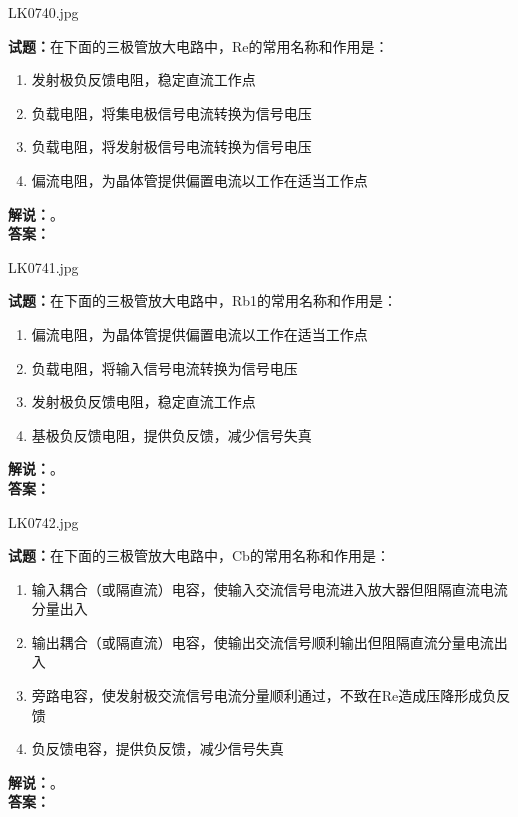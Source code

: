 \documentclass{ctexbook}
\begin{document}
LK0740.jpg

\noindent\textbf{试题：}在下面的三极管放大电路中，Re的常用名称和作用是：
\begin{enumerate}[leftmargin=3em]
  \item 发射极负反馈电阻，稳定直流工作点
  \item 负载电阻，将集电极信号电流转换为信号电压
  \item 负载电阻，将发射极信号电流转换为信号电压
  \item 偏流电阻，为晶体管提供偏置电流以工作在适当工作点
\end{enumerate}
\noindent\textbf{解说：}\textbf{}。\\\noindent\textbf{答案：}

\vspace{\baselineskip}

LK0741.jpg

\noindent\textbf{试题：}在下面的三极管放大电路中，Rb1的常用名称和作用是：
\begin{enumerate}[leftmargin=3em]
  \item 偏流电阻，为晶体管提供偏置电流以工作在适当工作点
  \item 负载电阻，将输入信号电流转换为信号电压
  \item 发射极负反馈电阻，稳定直流工作点
  \item 基极负反馈电阻，提供负反馈，减少信号失真
\end{enumerate}
\noindent\textbf{解说：}\textbf{}。\\\noindent\textbf{答案：}

\vspace{\baselineskip}

LK0742.jpg

\noindent\textbf{试题：}在下面的三极管放大电路中，Cb的常用名称和作用是：
\begin{enumerate}[leftmargin=3em]
  \item 输入耦合（或隔直流）电容，使输入交流信号电流进入放大器但阻隔直流电流分量出入
  \item 输出耦合（或隔直流）电容，使输出交流信号顺利输出但阻隔直流分量电流出入
  \item 旁路电容，使发射极交流信号电流分量顺利通过，不致在Re造成压降形成负反馈
  \item 负反馈电容，提供负反馈，减少信号失真
\end{enumerate}
\noindent\textbf{解说：}\textbf{}。\\\noindent\textbf{答案：}

\vspace{\baselineskip}
\end{document}

